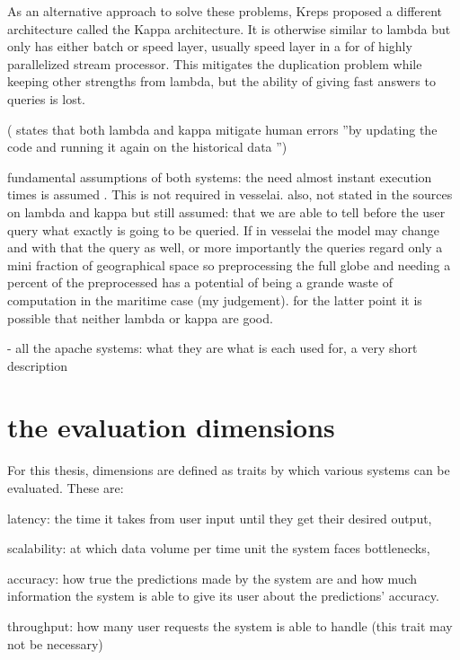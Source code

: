 As an alternative approach to solve these problems, Kreps proposed a different architecture called the Kappa architecture. It is otherwise similar to lambda but only has either batch or speed layer, usually speed layer in a for of highly parallelized stream processor. This mitigates the duplication problem while keeping other strengths from lambda, but the ability of giving fast answers to queries is lost.

(\cite{D1.1} states that both lambda and kappa mitigate human errors ''by  updating  the  code  and  running  it  again  on  the historical  data '')


fundamental assumptions of both systems:  the need almost instant execution times is assumed \cite{lambdakappa}. This is not required in vesselai. also, not stated in the sources on lambda and kappa but still assumed: that we are able to tell before the user query what exactly is going to be queried. If in vesselai the model may change and with that the query as well, or more importantly the queries regard only a mini fraction of geographical space so preprocessing the full globe and needing a percent of the preprocessed has a potential of being a grande waste of computation in the maritime case (my judgement). for the latter point it is possible that neither lambda or kappa are good.

- all the apache systems: what they are what is each used for, a very short description


\section{the evaluation dimensions}

For this thesis, dimensions are defined as traits by which various systems can be evaluated. These are:

latency: the time it takes from user input until they get their desired output,

scalability: at which data volume per time unit the system faces bottlenecks,

accuracy: how true the predictions made by the system are and how much information the system is able to give its user about the predictions' accuracy.

throughput: how many user requests the system is able to handle (this trait may not be necessary)

